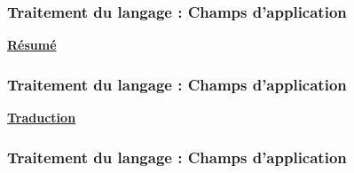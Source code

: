 \documentclass{formation}
\begin{document}
\begin{frame}
  \frametitle{Traitement du langage : Champs d'application}
  \underline{\textbf{Résumé}}
\end{frame}

\begin{frame}
  \frametitle{Traitement du langage : Champs d'application}
  \underline{\textbf{Traduction}}
  \begin{center}
  \end{center}
  \begin{center}
    \href{https://www.deepl.com/fr/translator}{}
  \end{center}
\end{frame}

\begin{frame}
  \frametitle{Traitement du langage : Champs d'application}
\end{frame}
\end{document}
